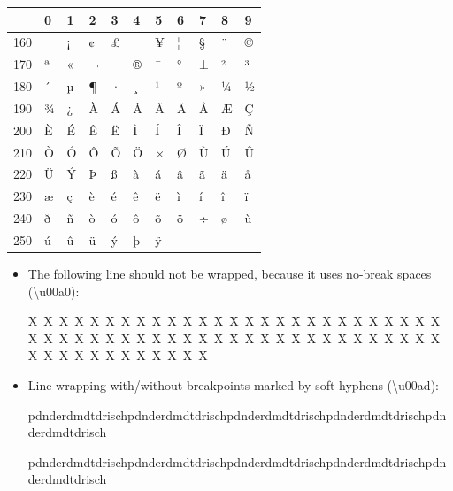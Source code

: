 \documentclass[a4paper]{article}
\newlength{\DUtablewidth} %
\begin{document}
\setlength{\DUtablewidth}{\linewidth}%
\begin{longtable*}{|p{0.051\DUtablewidth}|p{0.028\DUtablewidth}|p{0.028\DUtablewidth}|p{0.028\DUtablewidth}|p{0.028\DUtablewidth}|p{0.028\DUtablewidth}|p{0.028\DUtablewidth}|p{0.028\DUtablewidth}|p{0.028\DUtablewidth}|p{0.028\DUtablewidth}|p{0.028\DUtablewidth}|}
\hline

% 
 & 
0
 & 
1
 & 
2
 & 
3
 & 
4
 & 
5
 & 
6
 & 
7
 & 
8
 & 
9
 \\
\hline

160
 &  & 
¡
 & 
¢
 & 
£
 &  & 
¥
 & 
¦
 & 
§
 & 
¨
 & 
©
 \\
\hline

170
 & 
ª
 & 
«
 & 
¬
 & 
\-
 & 
®
 & 
¯
 & 
°
 & 
±
 & 
²
 & 
³
 \\
\hline

180
 & 
´
 & 
µ
 & 
¶
 & 
·
 & 
¸
 & 
¹
 & 
º
 & 
»
 & 
¼
 & 
½
 \\
\hline

190
 & 
¾
 & 
¿
 & 
À
 & 
Á
 & 
Â
 & 
Ã
 & 
Ä
 & 
Å
 & 
Æ
 & 
Ç
 \\
\hline

200
 & 
È
 & 
É
 & 
Ê
 & 
Ë
 & 
Ì
 & 
Í
 & 
Î
 & 
Ï
 & 
Ð
 & 
Ñ
 \\
\hline

210
 & 
Ò
 & 
Ó
 & 
Ô
 & 
Õ
 & 
Ö
 & 
×
 & 
Ø
 & 
Ù
 & 
Ú
 & 
Û
 \\
\hline

220
 & 
Ü
 & 
Ý
 & 
Þ
 & 
ß
 & 
à
 & 
á
 & 
â
 & 
ã
 & 
ä
 & 
å
 \\
\hline

230
 & 
æ
 & 
ç
 & 
è
 & 
é
 & 
ê
 & 
ë
 & 
ì
 & 
í
 & 
î
 & 
ï
 \\
\hline

240
 & 
ð
 & 
ñ
 & 
ò
 & 
ó
 & 
ô
 & 
õ
 & 
ö
 & 
÷
 & 
ø
 & 
ù
 \\
\hline

250
 & 
ú
 & 
û
 & 
ü
 & 
ý
 & 
þ
 & 
ÿ
 &  &  &  &  \\
\hline
\end{longtable*}

\begin{itemize}
\item The following line should not be wrapped, because it uses
no-break spaces (\textbackslash{}u00a0):

X X X X X X X X X X X X X X X X X X X X X X X X X X X X X X X X X X X X X X X X X X X X X X X X X X X X X X X X X X X X X X X X X X

\item Line wrapping with/without breakpoints marked by soft hyphens
(\textbackslash{}u00ad):

pdn\-derd\-mdtd\-ri\-schpdn\-derd\-mdtd\-ri\-schpdn\-derd\-mdtd\-ri\-schpdn\-derd\-mdtd\-ri\-schpdn\-derd\-mdtd\-ri\-sch

pdnderdmdtdrischpdnderdmdtdrischpdnderdmdtdrischpdnderdmdtdrischpdnderdmdtdrisch
\end{itemize}
\end{document}
